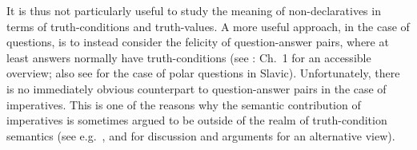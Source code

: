 \documentclass[output=paper,colorlinks,citecolor=brown]{langscibook}
\begin{document}
\ea \label{ex:clause-types}
\z\z        

\noindent It is thus not particularly useful to study the meaning of non-declaratives in terms of truth-conditions and truth-values. 
A more useful approach, in the case of questions, is to instead consider the felicity of question-answer pairs, where at least answers normally have truth-conditions (see \citealt{dayal16}: Ch.~1 for an accessible overview; also see  for the case of polar questions in Slavic). Unfortunately, there is no immediately obvious counterpart to question-answer pairs in the case of imperatives. This is one of the reasons why the semantic contribution of imperatives is sometimes argued to be outside of the realm of truth-condition semantics (see e.g.\ \cite[][1792]{han11}, and \cite{kaufmannBOOK,kaufmann21} for discussion and arguments for an alternative view).   
\end{document}
